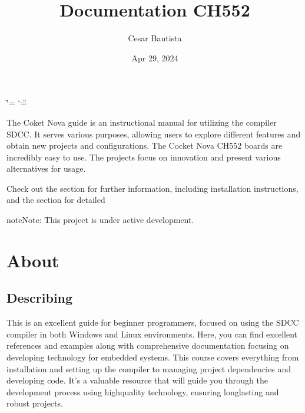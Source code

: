 \documentclass[letterpaper,10pt,english]{sphinxmanual}
\title{Documentation CH552}
\date{Apr 29, 2024}
\author{Cesar Bautista}
\begin{document}
\ifdefined\shorthandoff
  \ifnum\catcode`\=\string=\active\shorthandoff{=}\fi
  \ifnum\catcode`\"=\active{}\fi
\fi

\pagestyle{empty}
\sphinxmaketitle
\pagestyle{plain}
\sphinxtableofcontents
\pagestyle{normal}
\label{\detokenize{index::doc}}


\sphinxAtStartPar
{}

\sphinxAtStartPar
The Coket Nova guide is an instructional manual for utilizing the compiler SDCC. It serves various purposes, allowing users to explore different features and obtain new projects and
configurations.
The Cocket Nova CH552 boards are incredibly easy to use. The projects focus on innovation and
present various alternatives for usage.


\sphinxAtStartPar
Check out the  section for further information, including
installation instructions, and the  section for detailed

\begin{sphinxadmonition}{note}{Note:}
\sphinxAtStartPar
This project is under active development.
\end{sphinxadmonition}

\sphinxstepscope


\chapter{About}
\label{\detokenize{about:about}}\label{\detokenize{about::doc}}

\section{Describing}
\label{\detokenize{about:describing}}
\sphinxAtStartPar
This is an excellent guide for beginner programmers, focused on using the SDCC compiler in both Windows and Linux environments.
Here, you can find excellent references and examples along with comprehensive documentation focusing on developing technology for embedded systems.
This course covers everything from installation and setting up the compiler to managing project dependencies and developing code. It’s a valuable resource that will guide you through the development process using high\sphinxhyphen{}quality technology, ensuring long\sphinxhyphen{}lasting and robust projects.
\begin{quote}

\end{quote}
\end{document}
